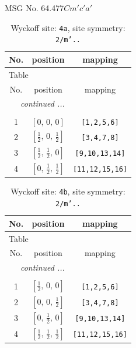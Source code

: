 \documentclass[fleqn,8pt]{jsarticle}
\begin{document}
\setcounter{MaxMatrixCols}{32}

\renewcommand{\tablename}{Table~}
\renewcommand{\figurename}{Figure~}
\begin{center}
\LARGE
MSG No. 64.477\quad$Cm'c'a'$
\end{center}
\renewcommand{\arraystretch}{1.2}
\begin{longtable}{ccc}
\caption{Wyckoff site: {\tt 4a}, site symmetry: {\tt 2/m'..}}
 \\
 \hline \hline
No. & position & mapping \\ \hline \endfirsthead

\multicolumn{2}{l}{\tablename\ \thetable{}} \\
 \hline \hline
No. & position & mapping \\ \hline \endhead

 \hline \hline
\multicolumn{2}{r}{\footnotesize\it continued ...} \\ \endfoot

 \hline \hline
\multicolumn{2}{r}{} \\ \endlastfoot

1 & $\left[ 0,\, 0,\, 0 \right]$ & {\tt [1,2,5,6]} \\ \hline
2 & $\left[ \frac{1}{2},\, 0,\, \frac{1}{2} \right]$ & {\tt [3,4,7,8]} \\ \hline
3 & $\left[ \frac{1}{2},\, \frac{1}{2},\, 0 \right]$ & {\tt [9,10,13,14]} \\ \hline
4 & $\left[ 0,\, \frac{1}{2},\, \frac{1}{2} \right]$ & {\tt [11,12,15,16]} \\
\end{longtable}
\renewcommand{\arraystretch}{1.2}
\begin{longtable}{ccc}
\caption{Wyckoff site: {\tt 4b}, site symmetry: {\tt 2/m'..}}
 \\
 \hline \hline
No. & position & mapping \\ \hline \endfirsthead

\multicolumn{2}{l}{\tablename\ \thetable{}} \\
 \hline \hline
No. & position & mapping \\ \hline \endhead

 \hline \hline
\multicolumn{2}{r}{\footnotesize\it continued ...} \\ \endfoot

 \hline \hline
\multicolumn{2}{r}{} \\ \endlastfoot

1 & $\left[ \frac{1}{2},\, 0,\, 0 \right]$ & {\tt [1,2,5,6]} \\ \hline
2 & $\left[ 0,\, 0,\, \frac{1}{2} \right]$ & {\tt [3,4,7,8]} \\ \hline
3 & $\left[ 0,\, \frac{1}{2},\, 0 \right]$ & {\tt [9,10,13,14]} \\ \hline
4 & $\left[ \frac{1}{2},\, \frac{1}{2},\, \frac{1}{2} \right]$ & {\tt [11,12,15,16]} \\
\end{longtable}
\end{document}
